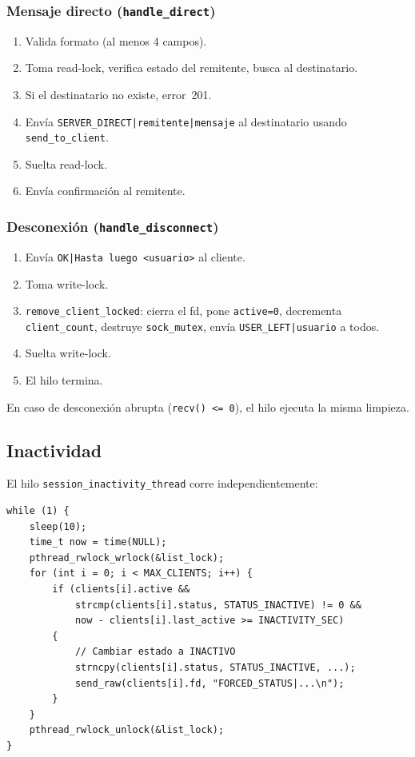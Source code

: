 \documentclass[12pt,a4paper]{article}
\begin{document}
\subsubsection{Mensaje directo (\texttt{handle\_direct})}

\begin{enumerate}[nosep]
    \item Valida formato (al menos 4 campos).
    \item Toma read-lock, verifica estado del remitente, busca al destinatario.
    \item Si el destinatario no existe, error~201.
    \item Envía \texttt{SERVER\_DIRECT|remitente|mensaje} al destinatario
          usando \texttt{send\_to\_client}.
    \item Suelta read-lock.
    \item Envía confirmación al remitente.
\end{enumerate}

\subsubsection{Desconexión (\texttt{handle\_disconnect})}

\begin{enumerate}[nosep]
    \item Envía \texttt{OK|Hasta luego <usuario>} al cliente.
    \item Toma write-lock.
    \item \texttt{remove\_client\_locked}: cierra el fd, pone \texttt{active=0},
          decrementa \texttt{client\_count}, destruye \texttt{sock\_mutex},
          envía \texttt{USER\_LEFT|usuario} a todos.
    \item Suelta write-lock.
    \item El hilo termina.
\end{enumerate}

En caso de desconexión abrupta (\texttt{recv() <= 0}), el hilo ejecuta la misma
limpieza.

\subsection{Inactividad}

El hilo \texttt{session\_inactivity\_thread} corre independientemente:

\begin{lstlisting}[caption={Hilo de inactividad (simplificado)}]
while (1) {
    sleep(10);
    time_t now = time(NULL);
    pthread_rwlock_wrlock(&list_lock);
    for (int i = 0; i < MAX_CLIENTS; i++) {
        if (clients[i].active &&
            strcmp(clients[i].status, STATUS_INACTIVE) != 0 &&
            now - clients[i].last_active >= INACTIVITY_SEC)
        {
            // Cambiar estado a INACTIVO
            strncpy(clients[i].status, STATUS_INACTIVE, ...);
            send_raw(clients[i].fd, "FORCED_STATUS|...\n");
        }
    }
    pthread_rwlock_unlock(&list_lock);
}
\end{lstlisting}
\end{document}
